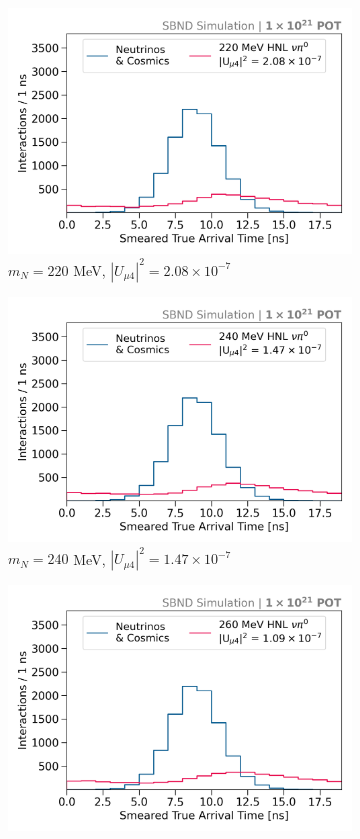 \begin{figure}[htbp!]
\begin{subfigure}[b]{0.495\textwidth}
            \includegraphics[width=\textwidth]{m220}
            \caption{$m_N = 220$ MeV, $|U_{\mu4}|^2 = 2.08 \times 10^{-7}$ }
        \end{subfigure}
        \begin{subfigure}[b]{0.495\textwidth}
            \includegraphics[width=\textwidth]{m240}
            \caption{$m_N = 240$ MeV, $|U_{\mu4}|^2 = 1.47 \times 10^{-7}$ }
        \end{subfigure}
	\centering
        \begin{subfigure}[b]{0.495\textwidth}
            \includegraphics[width=\textwidth]{m260}

\end{subfigure}
\end{figure}
